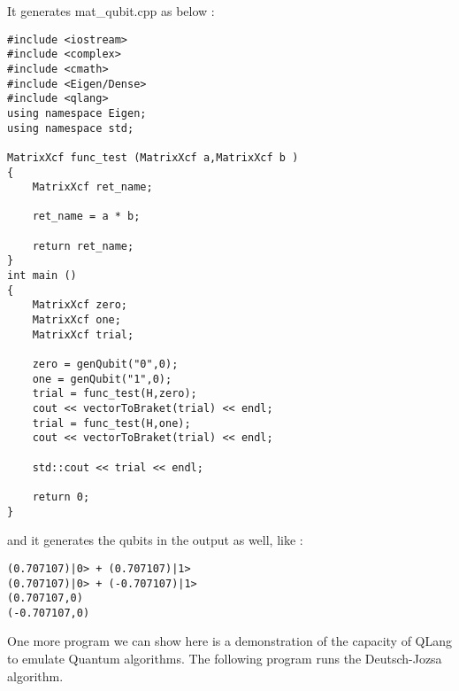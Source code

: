 It generates mat\_qubit.cpp as below :


\begin{lstlisting}
#include <iostream>
#include <complex>
#include <cmath>
#include <Eigen/Dense>
#include <qlang>
using namespace Eigen;
using namespace std;
        
MatrixXcf func_test (MatrixXcf a,MatrixXcf b )
{
	MatrixXcf ret_name;
 
	ret_name = a * b;

	return ret_name;
}
int main ()
{
	MatrixXcf zero;
	MatrixXcf one;
	MatrixXcf trial;
 
	zero = genQubit("0",0);
	one = genQubit("1",0);
	trial = func_test(H,zero);
	cout << vectorToBraket(trial) << endl;
	trial = func_test(H,one);
	cout << vectorToBraket(trial) << endl;

	std::cout << trial << endl;

	return 0;
}
\end{lstlisting}

and it generates the qubits in the output as well, like :

\begin{lstlisting}
(0.707107)|0> + (0.707107)|1>
(0.707107)|0> + (-0.707107)|1>
(0.707107,0)
(-0.707107,0)
\end{lstlisting}

One more program we can show here is a demonstration of the capacity of QLang to emulate Quantum algorithms. The following program runs the Deutsch-Jozsa algorithm.


